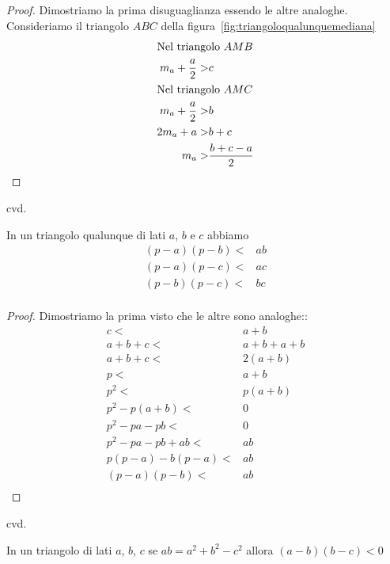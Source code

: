 \begin{proof}
	Dimostriamo la prima disuguaglianza essendo le altre analoghe. Consideriamo il triangolo $ABC$ della figura~\vref{fig:triangoloqualunquemediana}
	\begin{align*}
		\intertext{Nel triangolo $AMB$}
		m_a+\dfrac{a}{2}>&c\\
		\intertext{Nel triangolo $AMC$}
		m_a+\dfrac{a}{2}>&b\\
		2m_a+a>&b+c\\
		m_a>&\dfrac{b+c-a}{2}
	\end{align*}
\end{proof}
cvd.
\begin{thm}\label{thm:triangoloprodottolati}
	In un triangolo qualunque  di lati $a$, $b$ e $c$ abbiamo
	\begin{align*}
	(p-a)(p-b)<&ab\\
	(p-a)(p-c)<&ac\\
	(p-b)(p-c)<&bc\\
	\end{align*}
\end{thm}
\begin{proof}
	Dimostriamo la prima visto che le altre sono analoghe::
	\begin{align*}
	c<&a+b\\
a+b+c<&a+b+a+b\\
a+b+c<&2(a+b)\\
p<&a+b\\
p^2<&p(a+b)\\
p^2-p(a+b)<&0\\
p^2-pa-pb<&0\\
p^2-pa-pb+ab<&ab\\
p(p-a)-b(p-a)<&ab\\
(p-a)(p-b)<&ab\\
\end{align*}
\end{proof}
cvd.
\begin{thm}\label{thm:Prodotti_negativi}
In un triangolo di lati $a$, $b$, $c$ se $ab=a^2+b^2-c^2$ allora $(a-b)(b-c)<0$
\end{thm}
